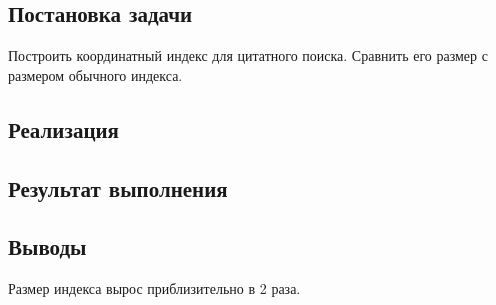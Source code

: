 \documentclass[a4paper, 12pt]{article}
\begin{document}

\newpage


\subsection*{Постановка задачи}
Построить координатный индекс для цитатного поиска. Сравнить его размер с размером обычного индекса.


\subsection*{Реализация}




\subsection*{Результат выполнения}



\subsection*{Выводы}
Размер индекса вырос приблизительно в 2 раза.
\end{document}
